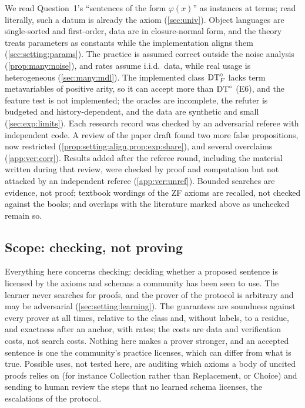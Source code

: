 We read Question~1's ``sentences of the form $\varphi(x)$'' as instances at terms; read literally, such a datum is
already the axiom (\cref{sec:univ}). Object languages are single-sorted and first-order, data are in closure-normal form,
and the theory treats parameters as constants while the implementation aligns them (\cref{sec:setting:params}). The
practice is assumed correct outside the noise analysis (\cref{prop:many:noise}), and rates assume i.i.d.\ data, while
real usage is heterogeneous (\cref{sec:many:mdl}). The implemented class $\mathrm{DT}^{\circ}_{F}$ lacks term metavariables of positive
arity, so it can accept more than $\mathrm{DT}^{\circ}$ (E6), and the feature test is not implemented; the oracles are incomplete, the
refuter is budgeted and history-dependent, and the data are synthetic and small (\cref{sec:exp:limits}). Each research
record was checked by an adversarial referee with independent code. A review of the paper draft found two more false
propositions, now restricted (\cref{prop:setting:align,prop:exp:share}), and several overclaims (\cref{app:ver:corr}).
Results added after the referee round, including the material written during that review, were checked by proof and
computation but not attacked by an independent referee (\cref{app:ver:unref}). Bounded searches are evidence, not
proof; textbook wordings of the ZF axioms are recalled, not checked against the books; and overlaps with the literature
marked above as unchecked remain so.

\subsection{Scope: checking, not proving}\label{sec:disc:scope}

Everything here concerns checking: deciding whether a proposed sentence is licensed by the axioms and schemas a
community has been seen to use. The learner never searches for proofs, and the prover of the protocol is arbitrary and
may be adversarial (\cref{sec:setting:learning}). The guarantees are soundness against every prover at all times,
relative to the class and, without labels, to a residue, and exactness after an anchor, with rates; the costs are data
and verification costs, not search costs. Nothing here makes a prover stronger, and an accepted sentence is one the
community's practice licenses, which can differ from what is true. Possible uses, not tested here, are auditing which
axioms a body of uncited proofs relies on (for instance Collection rather than Replacement, or Choice) and sending to
human review the steps that no learned schema licenses, the escalations of the protocol.
